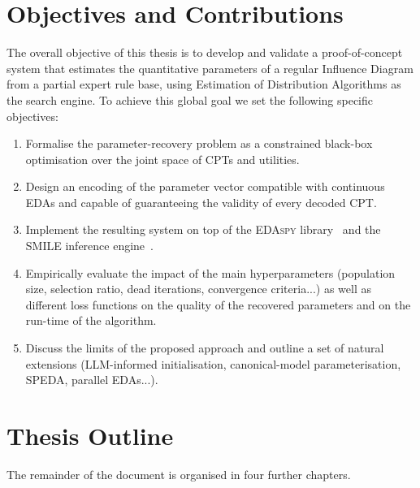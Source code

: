 \section{Objectives and Contributions}

The overall objective of this thesis is to develop and validate a
proof-of-concept system that estimates the quantitative parameters of
a regular Influence Diagram from a partial expert rule base, using
Estimation of Distribution Algorithms as the search engine. To
achieve this global goal we set the following specific objectives:
\begin{enumerate}
    \item Formalise the parameter-recovery problem as a constrained
          black-box optimisation over the joint space of CPTs and
          utilities.
    \item Design an encoding of the parameter vector compatible with
          continuous EDAs and capable of guaranteeing the validity of
          every decoded CPT.
    \item Implement the resulting system on top of the
          \textsc{EDAspy} library~\cite{soloviev2024edaspy} and the
          \textsc{SMILE} inference engine~\cite{genie}.
    \item Empirically evaluate the impact of the main
          hyperparameters (population size, selection ratio, dead iterations, convergence criteria...) as well as different loss functions on the quality of the recovered parameters and
          on the run-time of the algorithm.
    \item Discuss the limits of the proposed approach and outline a set of natural extensions (LLM-informed initialisation,
          canonical-model parameterisation, SPEDA, parallel EDAs...).
\end{enumerate}

\section{Thesis Outline}

The remainder of the document is organised in four further chapters.

